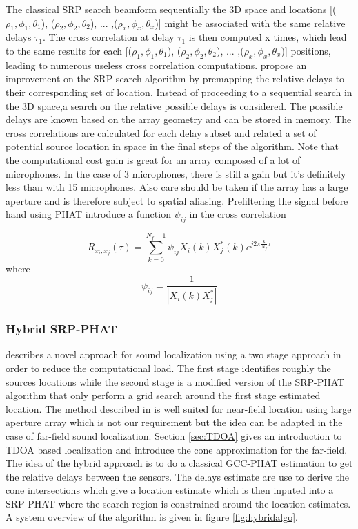The classical SRP search beamform sequentially the 3D space and locations [($\rho_{1},\phi_{1},\theta_{1}$), ($\rho_{2},\phi_{2},\theta_{2}$), ... ,($\rho_{x},\phi_{x},\theta_{x}$)] might be associated with the same relative delays $\tau_{1}$. The cross correlation at delay $\tau_{1}$ is then computed x times, which lead to the same results for each [($\rho_{1},\phi_{1},\theta_{1}$), ($\rho_{2},\phi_{2},\theta_{2}$), ... ,($\rho_{x},\phi_{x},\theta_{x}$)] positions, leading to numerous useless cross correlation computations. \cite{dmochowski2007generalized} propose an improvement on the SRP search algorithm by premapping the relative delays to their corresponding set of location. Instead of proceeding to a sequential search in the 3D space,a search on the relative possible delays is considered. The possible delays are known based on the array geometry and can be stored in memory. The cross correlations are calculated for each delay subset and related a set of potential source location in space in the final steps of the algorithm. Note that the computational cost gain is great for an array composed of a lot of microphones. In the case of 3 microphones, there is still a gain but it's definitely less than with 15 microphones. Also care should be taken if the array has a large aperture and is therefore subject to spatial aliasing. Prefiltering the signal before hand using PHAT introduce a function $\psi_{ij}$ in the cross correlation

\begin{equation}
    R_{x_i,x_j}(\tau)= \sum\limits_{k=0}^{N_{f}-1}{\psi_{ij} X_{i}(k)X_{j}^*(k)e^{j2\pi\frac{k}{N_{f}}\tau}}
\end{equation}
where
\begin{equation}
    \psi_{ij} = \frac{1}{|{X_{i}(k)X_{j}^*}|}
\end{equation}

\subsubsection{Hybrid SRP-PHAT}

\cite{peterson2005hybrid} describes a novel approach for sound localization using a two stage approach in order to reduce the computational load. The first stage identifies roughly the sources locations while the second stage is a modified version of the SRP-PHAT algorithm that only perform a grid search around the first stage estimated location. The method described in \cite{peterson2005hybrid} is well suited for near-field location using large aperture array which is not our requirement but the idea can be adapted in the case of far-field sound localization. Section \ref{sec:TDOA} gives an introduction to TDOA based localization and introduce the cone approximation for the far-field. The idea of the hybrid approach is to do a classical GCC-PHAT estimation to get the relative delays between the sensors. The delays estimate are use to derive the cone intersections which give a location estimate which is then inputed into a SRP-PHAT where the search region is constrained around the location estimates. A system overview of the algorithm is given in figure \ref{fig:hybridalgo}.

